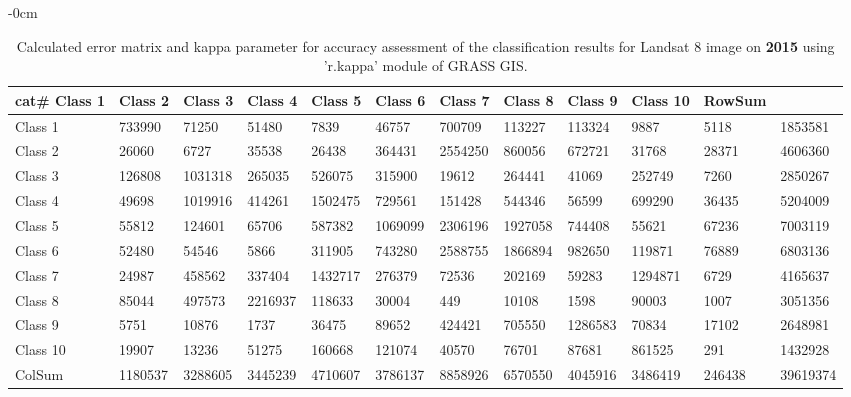 \documentclass[sustainability,article,submit,pdftex,moreauthors]{Definitions/mdpi}
\begin{document}
\begin{table}[H] 
\footnotesize
    \centering
    \begin{adjustwidth}{-\extralength}{0cm}
    \caption{Calculated error matrix and kappa parameter for accuracy assessment of the classification results for Landsat 8 image on \textbf{2015} using 'r.kappa' module of GRASS GIS.\label{tab03}}
 	\begin{tabularx}{\fulllength}{|l|l|l|l|l|l|l|l|l|l|l|l|}
    \toprule
        cat\# \textbf{Class 1} & \textbf{Class 2} & \textbf{Class 3} & \textbf{Class 4} & \textbf{Class 5} & \textbf{Class 6} & \textbf{Class 7} & \textbf{Class 8} & \textbf{Class 9} & \textbf{Class 10} & \textbf{RowSum} \\ \hline
        \midrule
        Class 1 & \cellcolor{green!20}733990 & 71250 & 51480 & 7839 & 46757 & 700709 & 113227 & 113324 & 9887 & 5118 & 1853581 \\ \hline
        Class 2 & 26060 & \cellcolor{green!20}6727 & 35538 & 26438 & 364431 & 2554250 & 860056 & 672721 & 31768 & 28371 & 4606360 \\ \hline
        Class 3 & 126808 & 1031318 & \cellcolor{green!20}265035 & 526075 & 315900 & 19612 & 264441 & 41069 & 252749 & 7260 & 2850267 \\ \hline
        Class 4 & 49698 & 1019916 & 414261 & \cellcolor{green!20}1502475 & 729561 & 151428 & 544346 & 56599 & 699290 & 36435 & 5204009 \\ \hline
        Class 5 & 55812 & 124601 & 65706 & 587382 & \cellcolor{green!20}1069099 & 2306196 & 1927058 & 744408 & 55621 & 67236 & 7003119 \\ \hline
        Class 6 & 52480 & 54546 & 5866 & 311905 & 743280 & \cellcolor{green!20}2588755 & 1866894 & 982650 & 119871 & 76889 & 6803136 \\ \hline
        Class 7 & 24987 & 458562 & 337404 & 1432717 & 276379 & 72536 & \cellcolor{green!20}202169 & 59283 & 1294871 & 6729 & 4165637 \\ \hline
        Class 8 & 85044 & 497573 & 2216937 & 118633 & 30004 & 449 & 10108 & \cellcolor{green!20}1598 & 90003 & 1007 & 3051356 \\ \hline
        Class 9 & 5751 & 10876 & 1737 & 36475 & 89652 & 424421 & 705550 & 1286583 & \cellcolor{green!20}70834 & 17102 & 2648981 \\ \hline
        Class 10 & 19907 & 13236 & 51275 & 160668 & 121074 & 40570 & 76701 & 87681 & 861525 & \cellcolor{green!20}291 & 1432928 \\ \hline
        ColSum & 1180537 & 3288605 & 3445239 & 4710607 & 3786137 & 8858926 & 6570550 & 4045916 & 3486419 & 246438 & \cellcolor{green!20}39619374 \\ \hline
        \bottomrule
    \end{tabularx}
    \end{adjustwidth}
\end{table}
\end{document}
